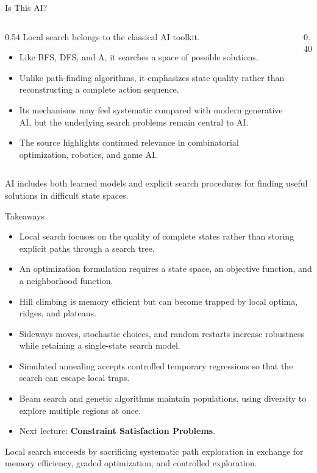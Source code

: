 \documentclass[aspectratio=169,10pt]{beamer}
\begin{document}
\begin{frame}[shrink=20]{Is This AI?}
  \begin{columns}[T,onlytextwidth]
    \begin{column}{0.54\textwidth}
      Local search belongs to the classical AI toolkit.

      \begin{itemize}
        \item Like BFS, DFS, and A\*, it searches a space of possible solutions.
        \item Unlike path-finding algorithms, it emphasizes state quality rather than reconstructing a complete action sequence.
        \item Its mechanisms may feel systematic compared with modern generative AI, but the underlying search problems remain central to AI.
        \item The source highlights continued relevance in combinatorial optimization, robotics, and game AI.
      \end{itemize}
    \end{column}

    \begin{column}{0.40\textwidth}
    \end{column}
  \end{columns}

  \begin{keyidea}
    AI includes both learned models and explicit search procedures for finding useful solutions in difficult state spaces.
  \end{keyidea}
\end{frame}

\begin{frame}[shrink=20]{Takeaways}
  \begin{itemize}
    \item Local search focuses on the quality of complete states rather than storing explicit paths through a search tree.
    \item An optimization formulation requires a state space, an objective function, and a neighborhood function.
    \item Hill climbing is memory efficient but can become trapped by local optima, ridges, and plateaus.
    \item Sideways moves, stochastic choices, and random restarts increase robustness while retaining a single-state search model.
    \item Simulated annealing accepts controlled temporary regressions so that the search can escape local traps.
    \item Beam search and genetic algorithms maintain populations, using diversity to explore multiple regions at once.
    \item Next lecture: \textbf{Constraint Satisfaction Problems}.
  \end{itemize}

  \begin{keyidea}
    Local search succeeds by sacrificing systematic path exploration in exchange for memory efficiency, graded optimization, and controlled exploration.
  \end{keyidea}
\end{frame}
\end{document}
